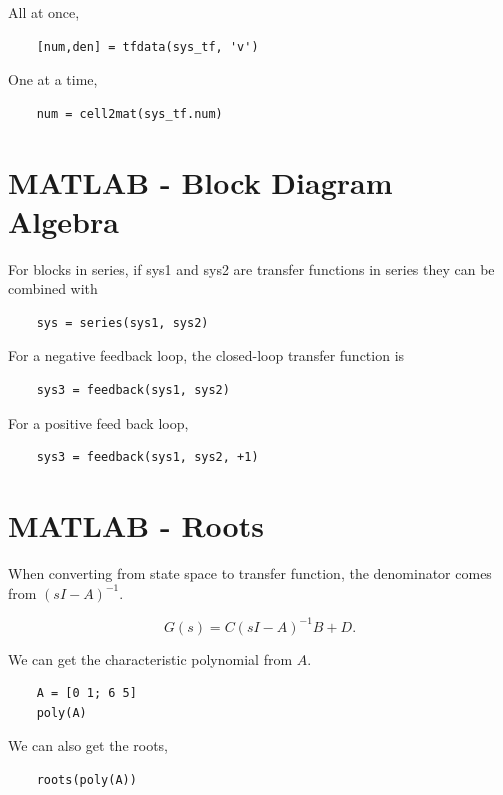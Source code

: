 \documentclass[12pt, a4paper]{report}
\begin{document}
  All at once,

  \begin{lstlisting}
    [num,den] = tfdata(sys_tf, 'v')
  \end{lstlisting}

  One at a time,

  \begin{lstlisting}
    num = cell2mat(sys_tf.num)
  \end{lstlisting}

  \section{MATLAB - Block Diagram Algebra}

  For blocks in series, if sys1 and sys2 are transfer functions in series they can be combined with

  \begin{lstlisting}
    sys = series(sys1, sys2)
  \end{lstlisting}

  For a negative feedback loop, the closed-loop transfer function is

  \begin{lstlisting}
    sys3 = feedback(sys1, sys2)
  \end{lstlisting}

  For a positive feed back loop,

  \begin{lstlisting}
    sys3 = feedback(sys1, sys2, +1)
  \end{lstlisting}

  \section{MATLAB - Roots}

  When converting from state space to transfer function, the denominator comes from $ (sI-A)^{-1}. $

  \[
      G(s) = C(sI-A)^{-1}B + D
    .\]

  We can get the characteristic polynomial from $ A. $

  \begin{lstlisting}
    A = [0 1; 6 5]
    poly(A)
  \end{lstlisting}

  We can also get the roots,

  \begin{lstlisting}
    roots(poly(A))
  \end{lstlisting}
\end{document}
